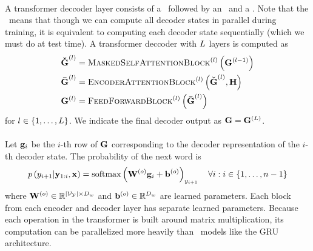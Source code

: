 

   
\paragraph{}
    A transformer deccoder layer consists of a \maskedselfattentionblock~followed
    by an \encoderattentionblock~and a \feedforwardblock. Note that the \maskedselfattentionblock~means that though we can compute all decoder states
    in parallel during training, it is equivalent to computing each decoder state sequentially (which we must do at test time). 
    A transformer deccoder with $L$ layers
    is computed as
\begin{align*} 
    {\boldsymbol{\check{\mathbf{G}}}}^{(l)} & = \textsc{MaskedSelfAttentionBlock}^{(l)}\left(\mathbf{G}^{(l-1)}\right) \\
    {\boldsymbol{\bar{\mathbf{G}}}}^{(l)} & = \textsc{EncoderAttentionBlock}^{(l)}\left(\boldsymbol{\check{\mathbf{G}}}^{(l)}, \mathbf{H}\right) \\
    \mathbf{G}^{(l)} & = \textsc{FeedForwardBlock}^{(l)}\left({\boldsymbol{\bar{\mathbf{G}}}^{(l)}}\right)
\end{align*} for $l \in \{1,\ldots,L\}$.
We indicate the final decoder output as $\mathbf{G} =  \mathbf{G}^{(L)}$.

\paragraph{}
    Let $\mathbf{g}_i$ be the $i$-th row of $\mathbf{G}$ corresponding
to the decoder representation of the $i$-th decoder state. The probability of 
  the next word is
   \[ p\left(y_{i+1}|\mathbf{y}_{1:i},\mathbf{x}\right) 
   = \operatorname*{softmax}\left( \mathbf{W}^{(o)}\mathbf{g}_i + \mathbf{b}^{(o)} \right)_{y_{i+1}} \quad \forall i : i \in \{1,\ldots, n-1\}\]
  where $\mathbf{W}^{(o)} \in \mathbb{R}^{{\left\vert \mathcal{V}_{\mathcal{Y}} \right\vert} \times D_{w}}$ 
  and $\mathbf{b}^{(o)} \in \mathbb{R}^{D_{w}}$ are learned parameters. 
Each block from each encoder and decoder layer has separate learned parameters.
Because each operation in the transformer is built around matrix 
multiplication, its computation can be parallelized more heavily than
\recurrentneuralnetwork~models like the GRU architecture.
 
